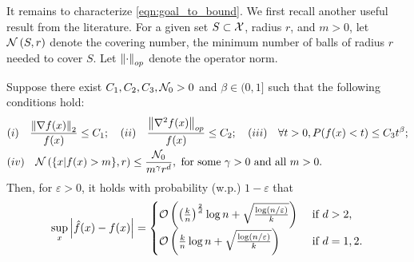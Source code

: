It remains to characterize \eqref{eqn:goal_to_bound}. We first recall another useful result from the literature. For a given set $S \subset \mathcal{X}$, radius $r$, and $m > 0$, let $\mathcal{N} \left( S, r \right)$ denote the covering number, the minimum number of balls of radius $r$ needed to cover $S$. Let $\left\lVert\cdot\right\rVert_{op}$ denote the operator norm.
%
\begin{lemma} \label{lem:zhao_lai}
    Suppose there exist $C_1, C_2, C_3, \mathcal{N}_0 > 0$ and $\beta \in (0, 1]$ such that the following conditions hold:
    \begin{align*}
        &(i) \quad \frac{\left\lVert \nabla f(x) \right\rVert_2}{f(x)} \leq C_1; \quad (ii) \quad \frac{ \left\lVert \nabla^2 f(x) \right\rVert_{op} }{f(x)} \leq C_2; \quad (iii) \quad \forall t > 0, P(f(x) < t) \leq C_3 t^{\beta}; \\
        &(iv) \quad \mathcal{N} \left( \{ x | f(x) > m \}, r \right) \leq \frac{\mathcal{N}_0}{m^{\gamma} r^d}, \text{ for some } \gamma > 0 \text{ and all } m > 0.
    \end{align*} 
    Then, for $\varepsilon > 0$, it holds with probability (w.p.) $1 - \varepsilon$ that
    \begin{equation} \sup_x \left| \hat{f}(x) - f(x) \right| =
        \begin{cases}
            \mathcal{O}\left( \left( \frac{k}{n} \right)^{\frac{2}{d}} \log n + \sqrt{ \frac{ \log ( n / \varepsilon ) }{k} } \right) & \text{ if } d > 2, \\
            \mathcal{O}\left( \frac{k}{n} \log n + \sqrt{ \frac{ \log ( n / \varepsilon ) }{k} } \right) & \text{ if } d = 1, 2.
        \end{cases}
    \end{equation}
\end{lemma}

